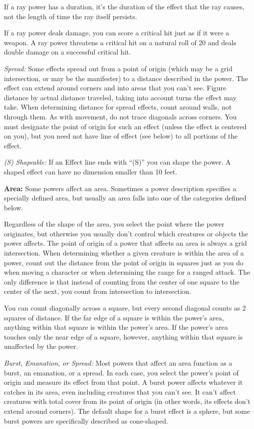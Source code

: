 \documentclass{article}
\begin{document}
If a ray power has a duration, it's the duration of the effect that the ray causes, 
not the length of time the ray itself persists.

If a ray power deals damage, you can score a critical hit just as if it were a 
weapon. A ray power threatens a critical hit on a natural roll of 20 and deals 
double damage on a successful critical hit.

\textit{Spread: }Some effects\textit{ }spread out from a point of origin (which 
may be a grid intersection, or may be the manifester) to a distance described in 
the power. The effect can extend around corners and into areas that you can't see. 
Figure distance by actual distance traveled, taking into account turns the effect 
may take. When determining distance for spread effects, count around walls, not 
through them. As with movement, do not trace diagonals across corners. You must 
designate the point of origin for such an effect (unless the effect is centered 
on you), but you need not have line of effect (see below) to all portions of the 
effect.

\textit{(S) Shapeable: }If an Effect line ends with ``(S)'' you can shape the power. 
A shaped effect can have no dimension smaller than 10 feet.

\textbf{Area:} Some powers affect an area. Sometimes a power description specifies 
a specially defined area, but usually an area falls into one of the categories 
defined below.

Regardless of the shape of the area, you select the point where the power originates, 
but otherwise you usually don't control which creatures or objects the power affects. 
The point of origin of a power that affects an area is always a grid intersection. 
When determining whether a given creature is within the area of a power, count 
out the distance from the point of origin in squares just as you do when moving 
a character or when determining the range for a ranged attack. The only difference 
is that instead of counting from the center of one square to the center of the 
next, you count from intersection to intersection.

You can count diagonally across a square, but every second diagonal counts as 2 
squares of distance. If the far edge of a square is within the power's area, anything 
within that square is within the power's area. If the power's area touches only 
the near edge of a square, however, anything within that square is unaffected by 
the power.

\textit{Burst, Emanation, or Spread: }Most powers that affect an area function 
as a burst, an emanation, or a spread. In each case, you select the power's point 
of origin and measure its effect from that point. A burst power affects whatever 
it catches in its area, even including creatures that you can't see. It can't affect 
creatures with total cover from its point of origin (in other words, its effects 
don't extend around corners). The default shape for a burst effect is a sphere, 
but some burst powers are specifically described as cone-shaped.
\end{document}

